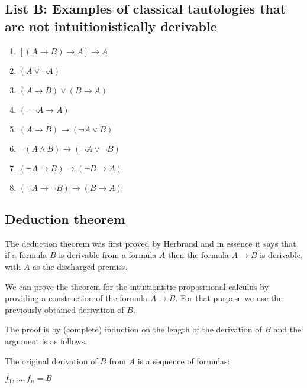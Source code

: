 \documentclass[12pt]{article}
\begin{document}
\subsection{List B: Examples of classical tautologies that are not intuitionistically derivable}

\begin{enumerate}
\item ${[(A \rightarrow B) \rightarrow A] \rightarrow A}$

\item $(A \vee \neg A)$

\item $(A \rightarrow B) \vee (B \rightarrow A)$

\item $(\neg \neg A \rightarrow A)$

\item $(A \rightarrow B) \rightarrow (\neg A \vee B)$

\item $\neg (A \wedge B) \rightarrow (\neg A \vee \neg B)$

\item $(\neg A \rightarrow B) \rightarrow (\neg B \rightarrow A)$

\item $(\neg A \rightarrow \neg B) \rightarrow (B \rightarrow A)$
\end{enumerate}

\subsection{Deduction theorem}

The deduction theorem was first proved by Herbrand and in essence it says that if a formula $B$ is derivable from a formula $A$ then the formula $A \rightarrow B$ is derivable, with $A$ as the discharged premiss.
 
We can prove the theorem for the intuitionistic propositional calculus by providing a construction of the formula $A \rightarrow B$. For that purpose we use the previously obtained derivation of $B$.

The proof is by (complete) induction on the length of the derivation of $B$ and the argument is as follows.

The original derivation of $B$ from $A$ is a sequence of formulas:

\begin{center} 
$f_1, \ldots, f_n = B$
\end{center}
\end{document}

